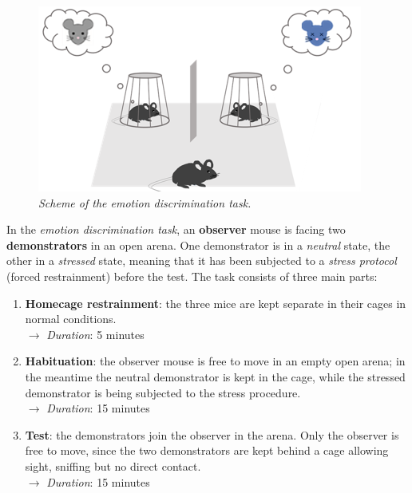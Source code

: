 \documentclass[12pt, a4paper]{report}
\begin{document}
\begin{figure}[H]
	\begin{center}
		\includegraphics[scale=.98]{emotion_discrimination.png} 
	\end{center} 
	\caption{\textit{Scheme of the emotion discrimination task.}}
	
\end{figure}

In the \textit{emotion discrimination task}, an \textbf{observer} mouse is facing two \textbf{demonstrators} in an open arena. One demonstrator is in a \textit{neutral} state, the other in a \textit{stressed} state, meaning that it has been subjected to a \textit{stress protocol} (forced restrainment) before the test. The task consists of three main parts:

\begin{enumerate}
	
	\item \textbf{Homecage restrainment}: the three mice are kept separate in their cages in normal conditions. \\
	$\longrightarrow$ \textit{Duration}: 5 minutes
	
	\item \textbf{Habituation}: the observer mouse is free to move in an empty open arena; in the meantime the neutral demonstrator is kept in the cage, while the stressed demonstrator is being subjected to the stress procedure. \\
	$\longrightarrow$  \textit{Duration}: 15 minutes
	
	\item \textbf{Test}: the demonstrators join the observer in the arena. Only the observer is free to move, since the two demonstrators are kept behind a cage allowing sight, sniffing but no direct contact. \\
	$\longrightarrow$  \textit{Duration}: 15 minutes
\end{enumerate}
\end{document}
